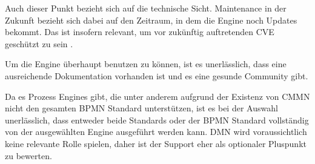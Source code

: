 Auch dieser Punkt bezieht sich auf die technische Sicht. Maintenance in der Zukunft bezieht sich dabei auf den Zeitraum, in dem die Engine noch Updates bekommt. Das ist insofern relevant, um vor zukünftig auftretenden \acs{CVE} geschützt zu sein  \citep{mitre_cve_2024}.

Um die Engine überhaupt benutzen zu können, ist es unerlässlich, dass eine ausreichende Dokumentation vorhanden ist und es eine gesunde Community gibt.

Da es Prozess Engines gibt, die unter anderem aufgrund der Existenz von \ac{CMMN} nicht den gesamten \ac{BPMN} Standard unterstützen, ist es bei der Auswahl unerlässlich, dass entweder beide Standards oder der \ac{BPMN} Standard vollständig von der ausgewählten Engine ausgeführt werden kann. \ac{DMN} wird voraussichtlich keine relevante Rolle spielen, daher ist der Support eher als optionaler Pluspunkt zu bewerten.


